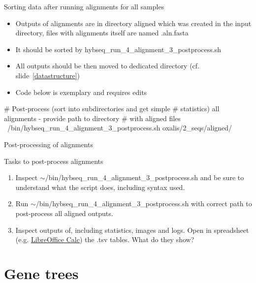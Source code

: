 \documentclass[compress, ucs, xelatex, 11pt, xcolor=x11names, aspectratio=169,
	hyperref={
		bookmarks=true,
		unicode=true,
		colorlinks=true,
		pdftitle={HybSeq course},
		plainpages=false,
		pdfauthor={Vojtech Zeisek},
		pdfsubject={Practical processing of HybSeq target enrichment sequencing data on computing grids like MetaCentrum},
		pdfcreator={XeLaTeX},
		pdfkeywords={BASH, command line, GNU, HybSeq, Linux, MetaCentrum, sequencing shell, target enrichment},
		linkcolor=Cyan2, %
		anchorcolor=Firebrick2, %
		citecolor=Firebrick2, %
		filecolor=Firebrick2, %
		menucolor=Firebrick2, %
		urlcolor=Chartreuse2, %
		pdftex},
	url={hyphens, lowtilde} %
	]{beamer}
\renewcommand{\texttt}[1]{\colorbox{Snow4}{{\ttfamily #1}}}
\renewcommand{\alert}[1]{\textcolor{OrangeRed2}{#1}}
\begin{document}
\begin{frame}[fragile]{Sorting data after running alignments for all samples}
	\begin{itemize}
		\item Outputs of alignments are in directory \texttt{aligned} which was created in the input directory, files with alignments itself are named \texttt{*.aln.fasta}
		\item It should be sorted by \texttt{hybseq\_run\_4\_alignment\_3\_postprocess.sh}
		\item All outputs should be then moved to dedicated directory (cf. slide~\ref{datastructure})
		\item \alert{Code below is exemplary and requires edits}
	\end{itemize}
	\begin{bashcode}
    # Post-process (sort into subdirectories and get simple
    # statistics) all alignments - provide path to directory
    # with aligned files
    ~/bin/hybseq_run_4_alignment_3_postprocess.sh oxalis/2_seqs/aligned/
	\end{bashcode}
\end{frame}

\begin{frame}{Post-processing of alignments}
	\begin{exampleblock}{Tasks to post-process alignments}
		\begin{enumerate}
			\item Inspect \texttt{$\sim$/bin/hybseq\_run\_4\_alignment\_3\_postprocess.sh} and be sure to understand what the script does, including syntax used.
			\item Run \texttt{$\sim$/bin/hybseq\_run\_4\_alignment\_3\_postprocess.sh}  with correct path to post-process all aligned outputs.
			\item Inspect outputs of, including statistics, images and logs. Open in spreadsheet (e.g. \href{https://www.libreoffice.org/}{LibreOffice Calc}) the \texttt{*.tsv} tables. What do they show?
		\end{enumerate}
	\end{exampleblock}
\end{frame}

\section{Gene trees}
\end{document}
